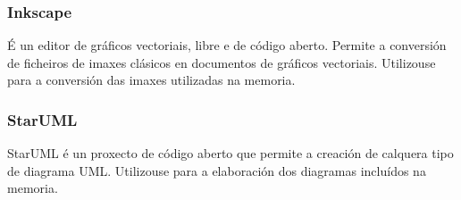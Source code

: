\subsubsection{Inkscape}
É un editor de gráficos vectoriais, libre e de código aberto. Permite a conversión de ficheiros de imaxes clásicos en documentos de gráficos vectoriais. Utilizouse para a conversión das imaxes utilizadas na memoria.


\subsubsection{StarUML}
StarUML é un proxecto de código aberto que permite a creación de calquera tipo de diagrama UML. Utilizouse para a elaboración dos diagramas incluídos na memoria.
